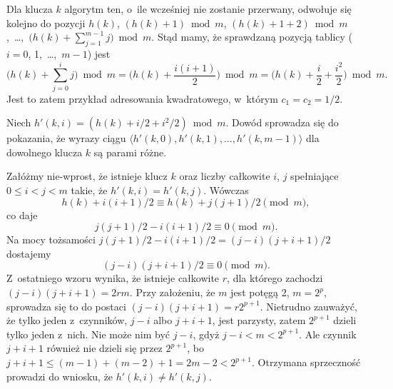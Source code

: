 
\subproblem %
Dla klucza $k$ algorytm ten, o~ile wcześniej nie zostanie przerwany, odwołuje się kolejno do pozycji $h(k)$, $(h(k)+1)\bmod m$, $(h(k)+1+2)\bmod m$,~\dots,~$\bigl(h(k)+\sum_{j=1}^{m-1}j\bigr)\bmod m$.
Stąd mamy, że  sprawdzaną pozycją tablicy ($i=0$, 1,~\dots,~$m-1$) jest
\[
	\biggl(h(k)+\sum_{j=0}^ij\biggr)\bmod m = \biggl(h(k)+\frac{i(i+1)}{2}\biggr)\bmod m = \biggl(h(k)+\frac{i}{2}+\frac{i^2}{2}\biggr)\bmod m.
\]
Jest to zatem przykład adresowania kwadratowego, w~którym $c_1=c_2=1/2$.

\subproblem %
Niech $h'(k,i)=(h(k)+i/2+i^2\!/2)\bmod m$.
Dowód sprowadza się do pokazania, że wyrazy ciągu $\langle h'(k,0),h'(k,1),\dots,h'(k,m-1)\rangle$ dla dowolnego klucza $k$ są parami różne.

Załóżmy nie-wprost, że istnieje klucz $k$ oraz liczby całkowite $i$, $j$ spełniające $0\le i<j<m$ takie, że $h'(k,i)=h'(k,j)$.
Wówczas
\[
	h(k)+i(i+1)/2 \equiv h(k)+j(j+1)/2 \pmod m,
\]
co daje
\[
	j(j+1)/2-i(i+1)/2 \equiv 0 \pmod m.
\]
Na mocy tożsamości $j(j+1)/2-i(i+1)/2=(j-i)(j+i+1)/2$ dostajemy
\[
	(j-i)(j+i+1)/2 \equiv 0 \pmod m.
\]
Z~ostatniego wzoru wynika, że istnieje całkowite $r$, dla którego zachodzi $(j-i)(j+i+1)=2rm$.
Przy założeniu, że $m$ jest potęgą 2, $m=2^p$, sprowadza się to do postaci $(j-i)(j+i+1)=r2^{p+1}$.
Nietrudno zauważyć, że tylko jeden z~czynników, $j-i$ albo $j+i+1$, jest parzysty, zatem $2^{p+1}$ dzieli tylko jeden z~nich.
Nie może nim być $j-i$, gdyż $j-i<m<2^{p+1}$.
Ale czynnik $j+i+1$ również nie dzieli się przez $2^{p+1}$, bo $j+i+1\le(m-1)+(m-2)+1=2m-2<2^{p+1}$.
Otrzymana sprzeczność prowadzi do wniosku, że $h'(k,i)\ne h'(k,j)$.


